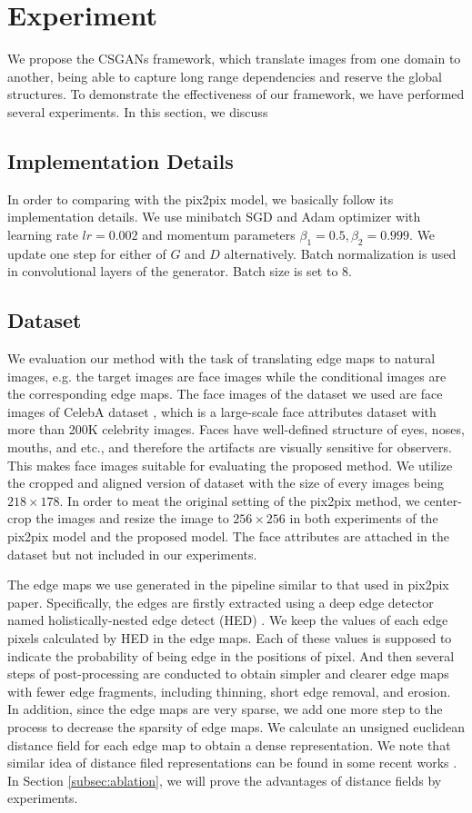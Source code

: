 \section{Experiment}
\label{sec:experiment}
We propose the CSGANs framework, which translate images from one domain to another, being able to capture long range dependencies and reserve the global structures. To demonstrate the effectiveness of our framework, we have performed several experiments. In this section, we discuss 
\subsection{Implementation Details}
In order to comparing with the pix2pix model, we basically follow its implementation details. We use minibatch SGD and Adam \cite{Adam} optimizer with learning rate $lr=0.002$ and momentum parameters $\beta_1=0.5, \beta_2=0.999$. We update one step for either of $G$ and $D$ alternatively. Batch normalization is used in convolutional layers of the generator. Batch size is set to 8.
\subsection{Dataset}
We evaluation our method with the task of translating edge maps to natural images, e.g. the target images are face images while the conditional images are the corresponding edge maps. The face images of the dataset we used are face images of CelebA dataset \cite{CelebA}, which  is a large-scale face attributes dataset with more than 200K celebrity images. Faces have well-defined structure of eyes, noses, mouths, and etc., and therefore the artifacts are visually sensitive for observers. This makes face images suitable for evaluating the proposed method.  We utilize the cropped and aligned version of dataset with the size of every images being $218\times 178$. In order to meat the original setting of the pix2pix method, we center-crop the images and resize the image to $256\times 256$ in both experiments of the pix2pix model and the proposed model. The face attributes are attached in the dataset but not included in our experiments. 

The edge maps we use generated in the pipeline similar to that used in pix2pix paper. Specifically, the edges are firstly extracted using a deep edge detector named holistically-nested edge detect (HED) \cite{HED}. We keep the values of each edge pixels calculated by HED in the edge maps. Each of these values is supposed to indicate the probability of being edge in the positions of pixel. And then several steps of post-processing are conducted to obtain simpler and clearer edge maps with fewer edge fragments, including thinning, short edge removal, and erosion. In addition, since the edge maps are very sparse, we add one more step to the process to decrease the sparsity of edge maps. We calculate an unsigned euclidean distance field for each edge map to obtain a dense representation. We note that similar idea of distance filed representations can be found in some recent works \cite{repair_3d, shape_completion, SketchyGANs}. In Section \ref{subsec:ablation}, we will prove the advantages of distance fields by experiments.


